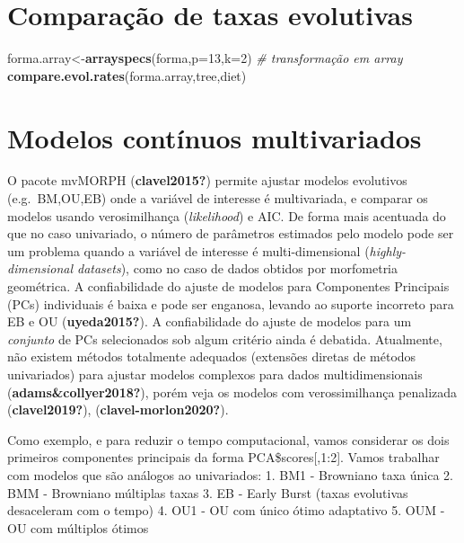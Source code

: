 \documentclass[
]{book}
\newenvironment{Shaded}{\begin{snugshade}}{\end{snugshade}}
\newcommand{\AttributeTok}[1]{\textcolor[rgb]{0.13,0.29,0.53}{#1}}
\newcommand{\CommentTok}[1]{\textcolor[rgb]{0.56,0.35,0.01}{\textit{#1}}}
\newcommand{\DecValTok}[1]{\textcolor[rgb]{0.00,0.00,0.81}{#1}}
\newcommand{\FunctionTok}[1]{\textcolor[rgb]{0.13,0.29,0.53}{\textbf{#1}}}
\newcommand{\NormalTok}[1]{#1}
\newcommand{\OtherTok}[1]{\textcolor[rgb]{0.56,0.35,0.01}{#1}}
\begin{document}
\section{Comparação de taxas evolutivas}\label{comparauxe7uxe3o-de-taxas-evolutivas}

\begin{Shaded}
\begin{Highlighting}[]
\NormalTok{forma.array}\OtherTok{\textless{}{-}}\FunctionTok{arrayspecs}\NormalTok{(forma,}\AttributeTok{p=}\DecValTok{13}\NormalTok{,}\AttributeTok{k=}\DecValTok{2}\NormalTok{) }\CommentTok{\# transformação em array}
\FunctionTok{compare.evol.rates}\NormalTok{(forma.array,tree,diet)}
\end{Highlighting}
\end{Shaded}

\section{Modelos contínuos multivariados}\label{modelos-contuxednuos-multivariados}

O pacote mvMORPH (\textbf{clavel2015?}) permite ajustar modelos evolutivos (e.g.~BM,OU,EB) onde a variável de interesse é multivariada, e comparar os modelos usando verosimilhança (\emph{likelihood}) e AIC. De forma mais acentuada do que no caso univariado, o número de parâmetros estimados pelo modelo pode ser um problema quando a variável de interesse é multi-dimensional (\emph{highly-dimensional datasets}), como no caso de dados obtidos por morfometria geométrica. A confiabilidade do ajuste de modelos para Componentes Principais (PCs) individuais é baixa e pode ser enganosa, levando ao suporte incorreto para EB e OU (\textbf{uyeda2015?}). A confiabilidade do ajuste de modelos para um \emph{conjunto} de PCs selecionados sob algum critério ainda é debatida. Atualmente, não existem métodos totalmente adequados (extensões diretas de métodos univariados) para ajustar modelos complexos para dados multidimensionais (\textbf{adams\&collyer2018?}), porém veja os modelos com verossimilhança penalizada (\textbf{clavel2019?}), (\textbf{clavel-morlon2020?}).

Como exemplo, e para reduzir o tempo computacional, vamos considerar os dois primeiros componentes principais da forma PCA\$scores{[},1:2{]}. Vamos trabalhar com modelos que são análogos ao univariados:
1. BM1 - Browniano taxa única
2. BMM - Browniano múltiplas taxas
3. EB - Early Burst (taxas evolutivas desaceleram com o tempo) 4. OU1 - OU com único ótimo adaptativo
5. OUM - OU com múltiplos ótimos
\end{document}
